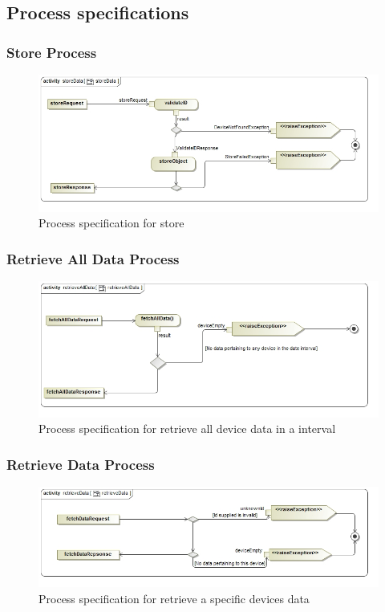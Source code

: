 \documentclass{article}
\begin{document}
	\subsection{Process specifications}
	\subsubsection{Store Process}
	\begin{figure}[H]
		\includegraphics[width=\textwidth]{images/storeData.jpg}
		\caption{Process specification for store \label{overflow}}
	\end{figure}
	\subsubsection{Retrieve All Data Process}
	\begin{figure}[H]
		\includegraphics[width=\textwidth]{images/retrieveAllData.jpg}
		\caption{Process specification for retrieve all device data in a interval \label{overflow}}
	\end{figure}
		\subsubsection{Retrieve Data Process}
		\begin{figure}[H]
			\includegraphics[width=\textwidth]{images/retrieveData.jpg}
			\caption{Process specification for retrieve a specific devices data \label{overflow}}
		\end{figure}
\end{document}
